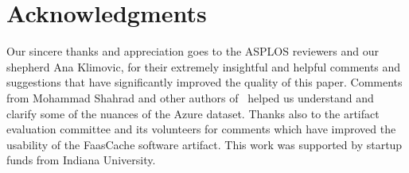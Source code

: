 \section*{Acknowledgments}

Our sincere thanks and appreciation goes to the ASPLOS reviewers and our shepherd Ana Klimovic, for their extremely insightful and helpful comments and suggestions that have significantly improved the quality of this paper. 
Comments from Mohammad Shahrad and other authors of~\cite{shahrad_serverless_2020} helped us understand and clarify some of the nuances of the Azure dataset.  
Thanks also to the artifact evaluation committee and its volunteers for comments which have improved the usability of the FaasCache software artifact. 
This work was supported by startup funds from Indiana University. 

